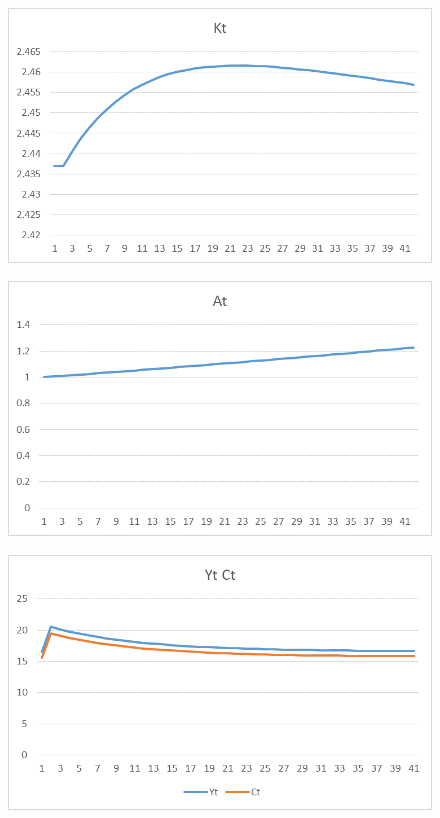 \documentclass{amsart}
\theoremstyle{plain}
\begin{document}
\begin{figure}[H]
\includegraphics[scale=.50]{12a.png}
\end{figure}
\begin{figure}[H]
\includegraphics[scale=.50]{12b.png}
\end{figure}
\begin{figure}[H]
\includegraphics[scale=.50]{12c.png}
\end{figure}
\end{document}
